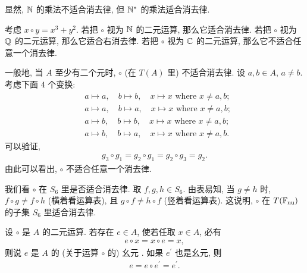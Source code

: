 \begin{example}
    显然, $\mathbb{N}$ 的乘法不适合消去律, 但 $\mathbb{N}^{\ast}$ 的乘法适合消去律.
\end{example}

\begin{example}
    考虑 $x \circ y = x^3 + y^2$. 若把 $\circ$ 视为 $\mathbb{N}$ 的二元运算, 那么它适合消去律. 若把 $\circ$ 视为 $\mathbb{Q}$ 的二元运算, 那么它适合右消去律. 若把 $\circ$ 视为 $\mathbb{C}$ 的二元运算, 那么它不适合任意一个消去律.
\end{example}

\begin{example}
    一般地, 当 $A$ 至少有二个元时, $\circ$ (在 $T(A)$ 里) 不适合消去律. 设 $a,b \in A$, $a \neq b$. 考虑下面 $4$ 个变换:
    \begin{align*}
         & a \mapsto a, \quad b \mapsto b, \quad x \mapsto x \text{ where $x \neq a,b$}; \tag*{$g_0 \colon$} \\
         & a \mapsto a, \quad b \mapsto a, \quad x \mapsto x \text{ where $x \neq a,b$}; \tag*{$g_1 \colon$} \\
         & a \mapsto b, \quad b \mapsto b, \quad x \mapsto x \text{ where $x \neq a,b$}; \tag*{$g_2 \colon$} \\
         & a \mapsto b, \quad b \mapsto a, \quad x \mapsto x \text{ where $x \neq a,b$}. \tag*{$g_3 \colon$}
    \end{align*}
    可以验证,
    \begin{align*}
        g_3 \circ g_1 = g_2 \circ g_1 = g_2 \circ g_3 = g_2.
    \end{align*}
    由此可以看出, $\circ$ 不适合任意一个消去律.
\end{example}

\begin{example}
    我们看 $\circ$ 在 $S_6$ 里是否适合消去律. 取 $f,g,h \in S_6$. 由表易知, 当 $g \neq h$ 时, $f \circ g \neq f \circ h$ (横着看运算表), 且 $g \circ f \neq h \circ f$ (竖着看运算表). 这说明, $\circ$ 在 $T(\mathbb{F}_{\mathrm{nu}})$ 的子集 $S_6$ 里适合消去律.
\end{example}

\begin{definition}
    设 $\circ$ 是 $A$ 的二元运算. 若存在 $e \in A$, 使若任取 $x \in A$, 必有
    \begin{align*}
        e \circ x = x \circ e = x,
    \end{align*}
    则说 $e$ 是 $A$ 的 (关于运算 $\circ$ 的) 幺元 . 如果 $e^{\prime}$ 也是幺元, 则
    \begin{align*}
        e = e \circ e^{\prime} = e^{\prime}.
    \end{align*}
\end{definition}

